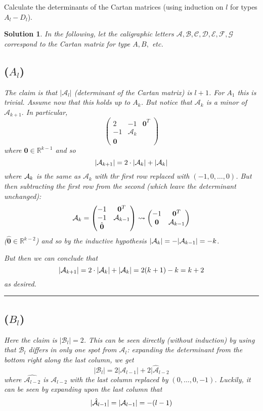 \documentclass[12pt]{article}
\newenvironment{hwprob}[1]
{\renewcommand{\theprob}{#1}%
 \addtocounter{thm}{-1}%
 \begin{prob}}
{\end{prob}}
\theoremstyle{nonumberbreak}
\newtheorem{sol}{Solution}
\theoremstyle{changebreak}
\theoremstyle{nonumberbreak}
\theoremstyle{change}
\newcommand*{\R}{
\mathbb{R}
}
\newcommand*{\brk}{
\rule{2in}{.1pt}
}
\let\tilde\relax
\newcommand*{\tilde}[1]{\widetilde{#1}}
\begin{document}
\begin{hwprob}{11.2}
	Calculate the determinants of the Cartan matrices (using induction on $l$ for types $A_l-D_l$).
\end{hwprob}
\begin{sol}
	In the following, let the caligraphic letters $\mathcal{A,B,C,D,E,F,G}$ correspond to the Cartan matrix 
	for type $A,B,$ etc.
\subsection*{($A_l$)}
	The claim is that $|\mathcal{A}_l|$ (determinant of the Cartan matrix) is $l+1$. For $A_1$ this is trivial.
	Assume now that this holds up to $A_{k}$. But notice that $\mathcal A_k$ is a minor of $\mathcal A_{k+1}.$ In particular,
	\[\begin{pmatrix}
		2 & -1 & \mathbf{0}^T\\
		-1 & \mathcal A_k &\\
		\mathbf{0} & &
	\end{pmatrix}\]
	where $\mathbf{0}\in\R^{k-1}$ and so
	\[|\mathcal A_{k+1}|=2\cdot |\mathcal A_k|+|\tilde{\mathcal A}_k|\]
	where $\tilde{\mathcal A}_k$ is the same as $\mathcal A_k$ with thr first row replaced with $(-1,0,\dots,0)$.
	But then subtracting the first row from the second (which leave the determinant unchanged):
	\[\tilde{\mathcal A}_k=\begin{pmatrix}
		-1 & \mathbf{0}^T\\
		-1 & \mathcal A_{k-1}\\
		\hat{\mathbf{0}} &
	\end{pmatrix}\rightsquigarrow\begin{pmatrix}
		-1 & \mathbf{0}^T\\
		\mathbf{0} & \mathcal A_{k-1}
	\end{pmatrix} \]
	($\hat{\mathbf{0}}\in\R^{k-2}$) and so by the inductive hypothesis $|\tilde{\mathcal A}_k|=-|\mathcal A_{k-1}|=-k$.

	But then we can conclude that
	\[|\mathcal A_{k+1}|=2\cdot |\mathcal A_k|+|\tilde{\mathcal A}_k|=2(k+1)-k=k+2\]
	as desired.

	\brk
	\subsection*{($B_l$)}
	Here the claim is $|\mathcal B_l|=2$. This can be seen directly (without induction) by using that 
	$\mathcal B_l$ differs in only one spot from $\mathcal A_l$: expanding the determinant from the 
	bottom right along the last column, we get 
	\[|\mathcal B_l|=2|\mathcal A_{l-1}|+2|\hat{\mathcal A}_{l-2}\]
	where $\hat{\mathcal A_{l-2}}$ is $\mathcal A_{l-2}$ with the last column replaced by $(0,\dots, 0,-1)$.
	Luckily, it can be seen by expanding upon the last column that
	\[|\hat{\mathcal A}_{l-1}|=|\tilde{\mathcal A}_{l-1}|=-(l-1)\]


\end{sol}
\end{document}
